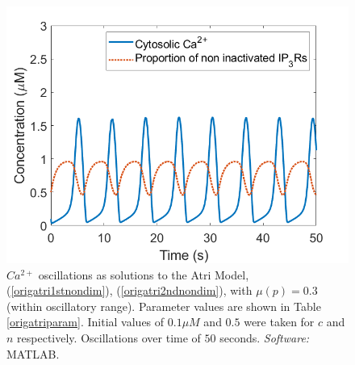 \begin{figure}[h!!!t!!!b!!!p]
  \centering
  \includegraphics[width=0.6\linewidth]{Chapters/2_Ca2+_Models/extras/orginalatrimu1.png}
  \caption{$Ca^{2+}$ oscillations as solutions to the Atri Model, (\ref{origatri1stnondim}), (\ref{origatri2ndnondim}), with $\mu(p)=0.3$ (within oscillatory range). Parameter values are shown in Table \ref{origatriparam}. Initial values of $0.1\mu M$ and $0.5$ were taken for $c$ and $n$ respectively. Oscillations over time of $50$ seconds. \textit{Software:} MATLAB.}\label{figorigatri}
\end{figure}

